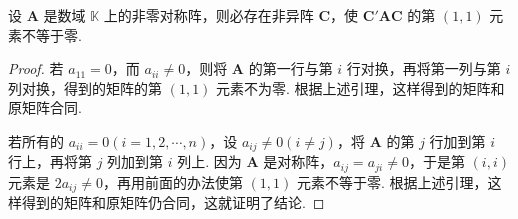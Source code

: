 \documentclass[../../main.tex]{subfiles}%
\begin{document}
\begin{lemma}\label{lemma:非零对称阵合同于(1,1)元素不为零的矩阵}
设 $\boldsymbol{A}$ 是数域 $\mathbb{K}$ 上的非零对称阵，则必存在非异阵 $\boldsymbol{C}$，使 $\boldsymbol{C}'\boldsymbol{A}\boldsymbol{C}$ 的第 $(1,1)$ 元素不等于零.
\end{lemma}
\begin{proof}

若 $a_{11} = 0$，而 $a_{ii}\neq 0$，则将 $\boldsymbol{A}$ 的第一行与第 $i$ 行对换，再将第一列与第 $i$ 列对换，得到的矩阵的第 $(1,1)$ 元素不为零. 根据上述引理，这样得到的矩阵和原矩阵合同.

若所有的 $a_{ii}=0 (i = 1,2,\cdots,n)$，设 $a_{ij}\neq 0 (i\neq j)$，将 $\boldsymbol{A}$ 的第 $j$ 行加到第 $i$ 行上，再将第 $j$ 列加到第 $i$ 列上. 因为 $\boldsymbol{A}$ 是对称阵，$a_{ij}=a_{ji}\neq 0$，于是第 $(i,i)$ 元素是 $2a_{ij}\neq 0$，再用前面的办法使第 $(1,1)$ 元素不等于零. 根据上述引理，这样得到的矩阵和原矩阵仍合同，这就证明了结论. 

\end{proof}
\end{document}
